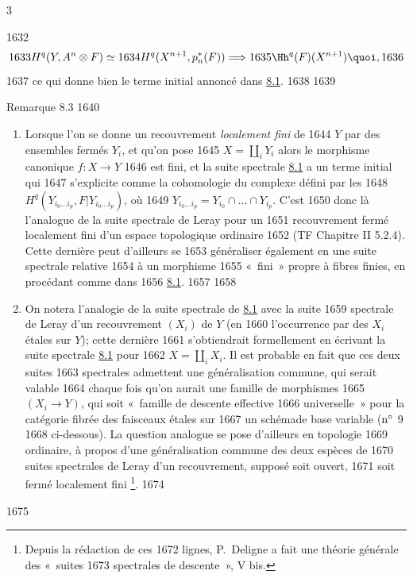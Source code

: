 3	\documentclass[10pt]{../fichiers-configuration-latex/smfart}
\begin{document}
  1632	$$
  1633	H^{q}(Y,A^{n}\otimes F)\simeq
  1634	H^{q}(X^{n+1},p^{\ast}_{n}(F))\Longrightarrow
  1635	\Hh^{q}(F)(X^{n+1}){\quoi},
  1636	$$
  1637	ce qui donne bien le terme initial annoncé dans \hyperref[VIII.prop8.1]{8.1}.
  1638	
  1639	\begin{enonce*}[remark]{Remarque 8.3}
  1640	\begin{enumerate}
  1641	\renewcommand{\theenumi}{\alph{enumi}}
  1642	\renewcommand{\labelenumi}{\theenumi)}
  1643	\item Lorsque l'on se donne un recouvrement \emph{localement fini} de
  1644	  $Y$ par des ensembles fermés $Y_{i}$, et qu'on pose
  1645	  $X=\coprod_{i}Y_{i}$ alors le morphisme canonique $f:X\rightarrow Y$
  1646	  est fini, et la suite spectrale \hyperref[VIII.prop8.1]{8.1} a un terme initial qui
  1647	  s'explicite comme la cohomologie du complexe défini par les
  1648	  $H^{q}(Y_{i_{0}\ldots i_{p}},F|Y_{i_{0}\ldots i_{p}})$, où
  1649	  $Y_{i_{0}\ldots i_{p}}=Y_{i_{0}}\cap\ldots\cap Y_{i_{p}}$. C'est
  1650	  donc là l'analogue de la suite spectrale de Leray pour un
  1651	  recouvrement fermé localement fini d'un espace topologique ordinaire
  1652	  (TF Chapitre II 5.2.4). Cette dernière peut d'ailleurs se
  1653	  généraliser également en une suite spectrale relative
  1654	  à un morphisme
  1655	  « fini » \ie propre à fibres finies, en procédant comme dans
  1656	  \hyperref[VIII.prop8.1]{8.1}.
  1657	
  1658	\item On notera l'analogie de la suite spectrale de \hyperref[VIII.prop8.1]{8.1} avec la suite
  1659	  spectrale de Leray d'un recouvrement $(X_{i})$ de $Y$ (en
  1660	  l'occurrence par des $X_{i}$ étales sur $Y$); cette dernière
  1661	  s'obtiendrait formellement en écrivant la suite spectrale \hyperref[VIII.prop8.1]{8.1} pour
  1662	  $X=\coprod_{i}X_{i}$. Il est probable en fait que ces deux suites
  1663	  spectrales admettent une généralisation commune, qui serait valable
  1664	  chaque fois qu'on aurait une famille de morphismes
  1665	  $(X_{i}\rightarrow Y)$, qui soit « famille de descente effective
  1666	  universelle » pour la catégorie fibrée des faisceaux étales sur
  1667	  un schéma\pageoriginale  de base variable (\cf ${\rm n^{\circ}}$ 9
  1668	  ci-dessous). La question analogue se pose d'ailleurs en topologie
  1669	  ordinaire, à propos d'une généralisation commune des deux espèces de
  1670	  suites spectrales de Leray d'un recouvrement, supposé soit ouvert,
  1671	  soit fermé localement fini \footnote[1]{Depuis la rédaction de ces
  1672	  lignes, P. Deligne a fait une théorie générale des « suites
  1673	  spectrales de descente », \cf \Exp V bis.}.
  1674	\end{enumerate}
  1675	\end{enonce*}
\end{document}
